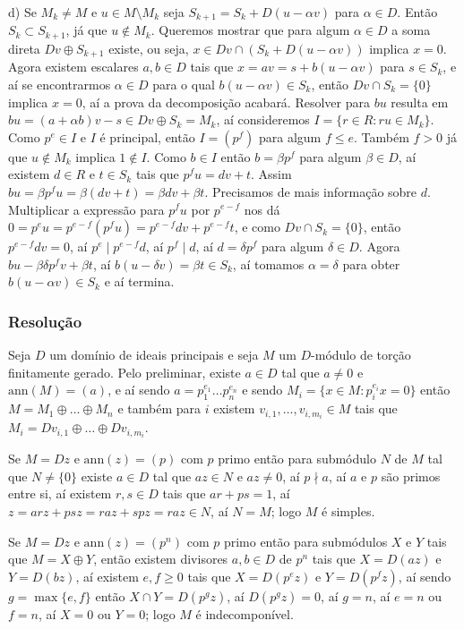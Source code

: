 \documentclass[10pt,a4paper]{article}
\begin{document}
\medskip
\noindent
d) Se $M_k\neq M$ e $u\in M\setminus M_k$ seja $S_{k+1}=S_k+D(u-\alpha v)$ para $\alpha\in D$. Então $S_k\subset S_{k+1}$, já que $u\notin M_k$. Queremos mostrar que para algum $\alpha\in D$ a soma direta $Dv\oplus S_{k+1}$ existe, ou seja, $x\in Dv\cap(S_k+D(u-\alpha v))$ implica $x=0$. Agora existem escalares $a,b\in D$ tais que $x=av=s+b(u-\alpha v)$ para $s\in S_k$, e aí se encontrarmos $\alpha\in D$ para o qual $b(u-\alpha v)\in S_k$, então $Dv\cap S_k=\{0\}$ implica $x=0$, aí a prova da decomposição acabará. Resolver para $bu$ resulta em $bu=(a+\alpha b)v-s\in Dv\oplus S_k=M_k$, aí consideremos $I=\{r\in R:ru\in M_k\}$. Como $p^e\in I$ e $I$ é principal, então $I=(p^f)$ para algum $f\leq e$. Também $f>0$ já que $u\notin M_k$ implica $1\notin I$. Como $b\in I$ então $b=\beta p^f$ para algum $\beta\in D$, aí existem $d\in R$ e $t\in S_k$ tais que $p^fu=dv+t$. Assim $bu=\beta p^fu=\beta(dv+t)=\beta dv+\beta t$. Precisamos de mais informação sobre $d$. Multiplicar a expressão para $p^f u$ por $p^{e-f}$ nos dá $0=p^eu=p^{e-f}(p^fu)=p^{e-f}dv+p^{e-f}t$, e como $Dv\cap S_k=\{0\}$, então $p^{e-f}dv=0$, aí $p^e\mid p^{e-f}d$, aí $p^f\mid d$, aí $d=\delta p^f$ para algum $\delta\in D$. Agora $bu-\beta\delta p^fv+\beta t$, aí $b(u-\delta v)=\beta t\in S_k$, aí tomamos $\alpha=\delta$ para obter $b(u-\alpha v)\in S_k$ e aí termina.

\subsubsection*{Resolução}

Seja $D$ um domínio de ideais principais e seja $M$ um $D$-módulo de torção finitamente gerado. Pelo preliminar, existe $a\in D$ tal que $a\neq 0$ e $\mathrm{ann}(M)=(a)$, e aí sendo $a=p_1^{e_1}\dots p_n^{e_n}$ e sendo $M_i=\{x\in M:p_i^{e_i}x=0\}$ então $M=M_1\oplus\dots\oplus M_n$ e também para $i$ existem $v_{i,1},\dots,v_{i,m_i}\in M$ tais que $M_i=Dv_{i,1}\oplus\dots\oplus Dv_{i,m_i}$.

\medskip
\noindent
Se $M=Dz$ e $\mathrm{ann}(z)=(p)$ com $p$ primo então para submódulo $N$ de $M$ tal que $N\neq \{0\}$ existe $a\in D$ tal que $az\in N$ e $az\neq 0$, aí $p\nmid a$, aí $a$ e $p$ são primos entre si, aí existem $r,s\in D$ tais que $ar+ps=1$, aí $z=arz+psz=raz+spz=raz\in N$, aí $N=M$; logo $M$ é simples.

\medskip
\noindent
Se $M=Dz$ e $\mathrm{ann}(z)=(p^n)$ com $p$ primo então para submódulos $X$ e $Y$ tais que $M=X\oplus Y$, então existem divisores $a,b\in D$ de $p^n$ tais que $X=D(az)$ e $Y=D(bz)$, aí existem $e,f\geq 0$ tais que $X=D(p^ez)$ e $Y=D(p^fz)$, aí sendo $g=\max\{e,f\}$ então $X\cap Y=D(p^gz)$, aí $D(p^gz)=0$, aí $g=n$, aí $e=n$ ou $f=n$, aí $X=0$ ou $Y=0$; logo $M$ é indecomponível.
\end{document}
